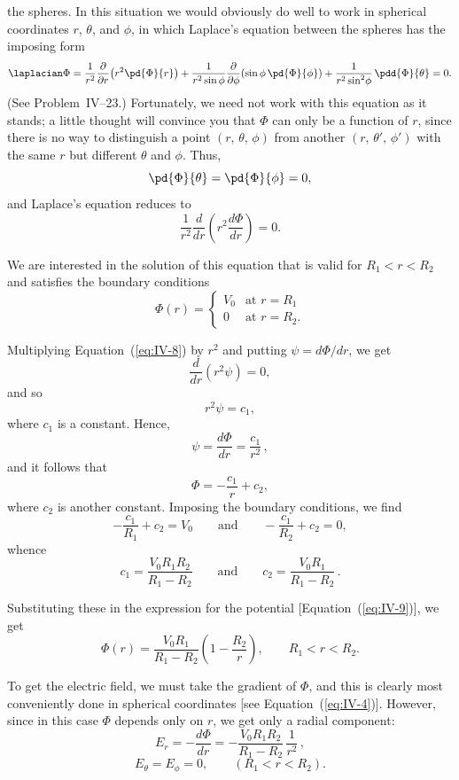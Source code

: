 \noindent the spheres.  In this situation we would obviously do well
to work in spherical coordinates $r$, $\theta$, and $\phi$, in which
Laplace's equation between the spheres has the imposing form
\[
\laplacian\Phi
= \frac{1}{r^2}\frac{\partial}{\partial r}
  \!\left(r^2\pd{\Phi}{r}\right)
+ \frac{1}{r^2\sin\phi}\frac{\partial}{\partial\phi}
  \!\left(\sin\phi\,\pd{\Phi}{\phi}\right)
+ \frac{1}{r^2\sin^2\!\phi}\,\pdd{\Phi}{\theta} = 0.
\]
(See Problem~IV--23.)  Fortunately, we need not work with this
equation as it stands; a little thought will convince you that $\Phi$
can only be a function of $r$, since there is no way to distinguish a
point $(r,\,\theta,\,\phi)$ from another $(r,\,\theta',\,\phi')$ with the
same $r$ but different $\theta$ and $\phi$.  Thus,
\[
\pd{\Phi}{\theta} = \pd{\Phi}{\phi} = 0,
\]
and Laplace's equation reduces to
\begin{equation}
\frac{1}{r^2}\frac{d}{dr}\!\left(r^2\frac{d\Phi}{dr}\right) = 0.
\label{eq:IV-8}
\end{equation}

We are interested in the solution of this equation that is valid for
$R_1 < r < R_2$ and satisfies the boundary conditions
\[
\Phi(r) = \begin{cases} V_0 & \text{at } r = R_1 \\ 0 & \text{at } r = R_2. \end{cases}
\]

Multiplying Equation~(\ref{eq:IV-8}) by $r^2$ and putting
$\psi = d\Phi/dr$, we get
\[
\frac{d}{dr}(r^2\psi) = 0,
\]
and so
\[
r^2\psi = c_1,
\]
where $c_1$ is a constant.  Hence,
\[
\psi = \frac{d\Phi}{dr} = \frac{c_1}{r^2}\,,
\]
and it follows that
\begin{equation}
\Phi = -\frac{c_1}{r} + c_2,
\label{eq:IV-9}
\end{equation}
where $c_2$ is another constant.  Imposing the boundary conditions,
we find
\[
-\frac{c_1}{R_1} + c_2 = V_0
\qquad\text{and}\qquad
-\frac{c_1}{R_2} + c_2 = 0,
\]
whence
\[
c_1 = \frac{V_0 R_1 R_2}{R_1 - R_2}
\qquad\text{and}\qquad
c_2 = \frac{V_0 R_1}{R_1 - R_2}\,.
\]

Substituting these in the expression for the potential
[Equation~(\ref{eq:IV-9})], we get
\[
\Phi(r) = \frac{V_0 R_1}{R_1 - R_2}
  \left(1 - \frac{R_2}{r}\right),
\qquad R_1 < r < R_2.
\]

To get the electric field, we must take the gradient of $\Phi$, and
this is clearly most conveniently done in spherical coordinates [see
Equation~(\ref{eq:IV-4})].  However, since in this case $\Phi$
depends only on $r$, we get only a radial component:
\[
E_r = -\frac{d\Phi}{dr}
    = -\frac{V_0 R_1 R_2}{R_1 - R_2}\,\frac{1}{r^2}\,,
\]
\[
E_\theta = E_\phi = 0,\qquad (R_1 < r < R_2).
\]

